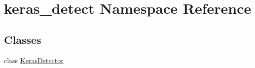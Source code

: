\hypertarget{namespacekeras__detect}{}\section{keras\+\_\+detect Namespace Reference}
\label{namespacekeras__detect}
\subsection*{Classes}
\begin{DoxyCompactItemize}
\item 
class \hyperlink{classkeras__detect_1_1_keras_detector}{Keras\+Detector}
\end{DoxyCompactItemize}
